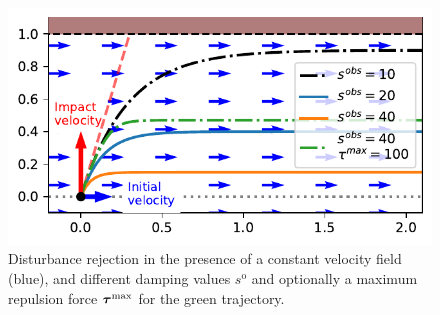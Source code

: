 \begin{figure}[htb]
\centering
  \centerline{\includegraphics[width=0.99\columnwidth]{figures/parallel_avoidance_obstacle}}
  \caption{Disturbance rejection in the presence of a constant velocity field (blue), and different damping values $s^{\mathrm{o}}$ and optionally a maximum repulsion force $\boldsymbol{\tau}^{\mathrm{max}}$ for the green trajectory.}
  \label{fig:disturbance_with_parallel_velocity}
\end{figure}
    
